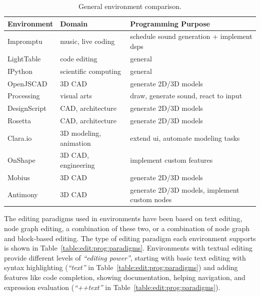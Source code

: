 \begin{table}
	\centering
	\renewcommand{\arraystretch}{1.2}

	\begin{tabulary}{\textwidth}{lLL}
		\toprule
		{\bf Environment}	& {\bf Domain} 						& {\bf Programming Purpose}												\\
		\midrule
		Impromptu			& music, live coding			& schedule sound generation + implement \glspl{dsp}	\\
		LightTable		& code editing						& general																					\\
		IPython				& scientific computing		& general																					\\
		OpenJSCAD			& 3D CAD									& generate 2D/3D models														\\
		Processing		& visual arts							& draw, generate sound, react to input						\\
		DesignScript	& CAD, architecture				& generate 2D/3D models														\\
		Rosetta				& CAD, architecture				& generate 2D/3D models														\\
		Clara.io			& 3D modeling, animation	& extend \gls{ui}, automate modeling tasks				\\
		OnShape				& 3D CAD, engineering			& implement custom features												\\
		Mobius				& 3D CAD									& generate 2D/3D models														\\
		Antimony			& 3D CAD									& generate 2D/3D models, implement custom nodes		\\
	\bottomrule
	\end{tabulary}

	\caption{General environment comparison.}
	\label{table:general:comp}
\end{table}

The editing paradigms used in environments have been based on text editing, node graph editing, a combination of these two, or a combination of node graph and block-based editing.
The type of editing paradigm each environment supports is shown in Table~\ref{table:edit:prog:paradigms}.
Environments with textual editing provide different levels of {\it ``editing power''}, starting with basic text editing with syntax highlighting ({\it ``text''} in Table~\ref{table:edit:prog:paradigms}) and adding features like code completion, showing documentation, helping navigation, and expression evaluation ({\it ``++text''} in Table~\ref{table:edit:prog:paradigms}).

